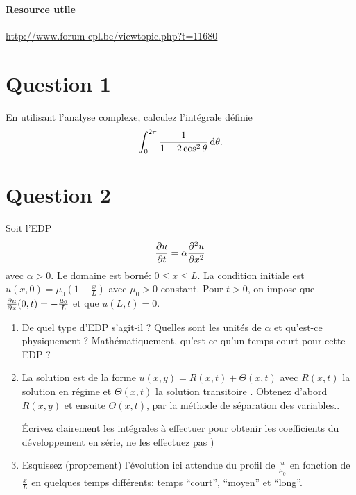 


\paragraph{Resource utile}
\url{http://www.forum-epl.be/viewtopic.php?t=11680}

\section*{Question 1}
En utilisant l'analyse complexe, calculez l'intégrale définie
\[ \int_0^{2\pi} \frac{1}{1+2\cos^2\theta} \operatorname{d}\!\theta. \]


\section*{Question 2}
Soit l'EDP
\[ \frac{\partial u}{\partial t} = \alpha\frac{\partial^2 u}{\partial x^2} \]
avec $\alpha > 0$. Le domaine est borné: $0 \leq x \leq L$.
La condition initiale est $u(x, 0) = \mu_0 (1 - \frac{x}{L})$
avec $\mu_0 > 0$ constant.
Pour $t > 0$, on impose que $\frac{\partial u}{\partial x}(0,t) = -\frac{\mu_0}{L}$
et que $u(L,t) = 0$.
\begin{enumerate}
  \item De quel type d'EDP s'agit-il ? Quelles sont les unités
    de $\alpha$ et qu'est-ce physiquement ?
    Mathématiquement, qu'est-ce qu'un temps court pour cette EDP ?
  \item
    La solution est de la forme  $u(x,y) = R(x,t) + \Theta(x,t)$ avec $R(x,t)$ la solution en régime et $\Theta(x,t)$ la solution transitoire . Obtenez d'abord $R(x,y)$ et ensuite $\Theta(x,t)$, par la méthode de séparation des variables..

    Écrivez clairement les intégrales à effectuer pour obtenir les coefficients du développement en série, ne les effectuez pas )
  \item Esquissez (proprement) l'évolution ici attendue du profil de
    $\frac{u}{\mu_0}$ en fonction de $\frac{x}{L}$ en quelques
    temps différents: temps ``court'', ``moyen'' et ``long''.
\end{enumerate}

